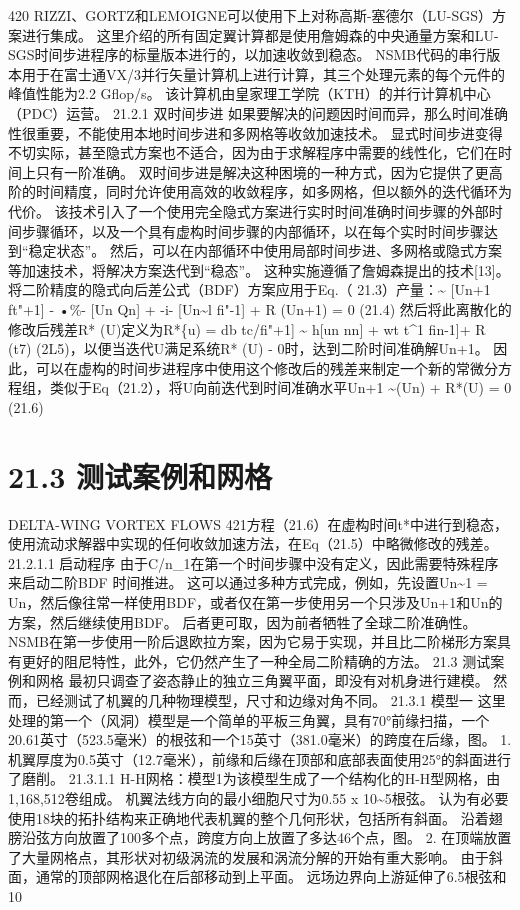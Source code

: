 \documentclass[UTF8,11pt,a4paper,openany,fontset=fandol]{ctexbook}
\begin{document}
420 RIZZI、GORTZ和LEMOIGNE可以使用下上对称高斯-塞德尔（LU-SGS）方案进行集成。 这里介绍的所有固定翼计算都是使用詹姆森的中央通量方案和LU-SGS时间步进程序的标量版本进行的，以加速收敛到稳态。 NSMB代码的串行版本用于在富士通VX/3并行矢量计算机上进行计算，其三个处理元素的每个元件的峰值性能为2.2 Gflop/s。 该计算机由皇家理工学院（KTH）的并行计算机中心（PDC）运营。 21.2.1 双时间步进 如果要解决的问题因时间而异，那么时间准确性很重要，不能使用本地时间步进和多网格等收敛加速技术。 显式时间步进变得不切实际，甚至隐式方案也不适合，因为由于求解程序中需要的线性化，它们在时间上只有一阶准确。 双时间步进是解决这种困境的一种方式，因为它提供了更高阶的时间精度，同时允许使用高效的收敛程序，如多网格，但以额外的迭代循环为代价。 该技术引入了一个使用完全隐式方案进行实时时间准确时间步骤的外部时间步骤循环，以及一个具有虚构时间步骤的内部循环，以在每个实时时间步骤达到“稳定状态”。 然后，可以在内部循环中使用局部时间步进、多网格或隐式方案等加速技术，将解决方案迭代到“稳态”。 这种实施遵循了詹姆森提出的技术[13]。 将二阶精度的隐式向后差公式（BDF）方案应用于Eq.（ 21.3）产量：\textasciitilde{} [Un+1 ft"+1] - •\%- [Un Qn] + -i- [Un\textasciitilde{}l fi"-1] + R (Un+1) = 0 (21.4) 然后将此离散化的修改后残差R* (U)定义为R*\{u) = db tc/fi"+1] \textasciitilde{} h[un nn] + wt t\textasciicircum{}1 fin-1]+ R (t7) (2L5)，以便当迭代U满足系统R* (U) - 0时，达到二阶时间准确解Un+1。 因此，可以在虚构的时间步进程序中使用这个修改后的残差来制定一个新的常微分方程组，类似于Eq（21.2），将U向前迭代到时间准确水平Un+1 \textasciitilde{}(Un) + R*(U) = 0 (21.6)

\section{21.3 测试案例和网格}
DELTA-WING VORTEX FLOWS 421方程（21.6）在虚构时间t*中进行到稳态，使用流动求解器中实现的任何收敛加速方法，在Eq（21.5）中略微修改的残差。 21.2.1.1 启动程序 由于C/n\_1在第一个时间步骤中没有定义，因此需要特殊程序来启动二阶BDF 时间推进。 这可以通过多种方式完成，例如，先设置Un\textasciitilde{}1 = Un，然后像往常一样使用BDF，或者仅在第一步使用另一个只涉及Un+1和Un的方案，然后继续使用BDF。 后者更可取，因为前者牺牲了全球二阶准确性。 NSMB在第一步使用一阶后退欧拉方案，因为它易于实现，并且比二阶梯形方案具有更好的阻尼特性，此外，它仍然产生了一种全局二阶精确的方法。 21.3 测试案例和网格 最初只调查了姿态静止的独立三角翼平面，即没有对机身进行建模。 然而，已经测试了机翼的几种物理模型，尺寸和边缘对角不同。 21.3.1 模型一 这里处理的第一个（风洞）模型是一个简单的平板三角翼，具有70°前缘扫描，一个20.61英寸（523.5毫米）的根弦和一个15英寸（381.0毫米）的跨度在后缘，图。 1. 机翼厚度为0.5英寸（12.7毫米），前缘和后缘在顶部和底部表面使用25°的斜面进行了磨削。 21.3.1.1 H-H网格：模型1为该模型生成了一个结构化的H-H型网格，由1,168,512卷组成。 机翼法线方向的最小细胞尺寸为0.55 x 10\textasciitilde{}5根弦。 认为有必要使用18块的拓扑结构来正确地代表机翼的整个几何形状，包括所有斜面。 沿着翅膀沿弦方向放置了100多个点，跨度方向上放置了多达46个点，图。 2. 在顶端放置了大量网格点，其形状对初级涡流的发展和涡流分解的开始有重大影响。 由于斜面，通常的顶部网格退化在后部移动到上平面。 远场边界向上游延伸了6.5根弦和10
\end{document}
